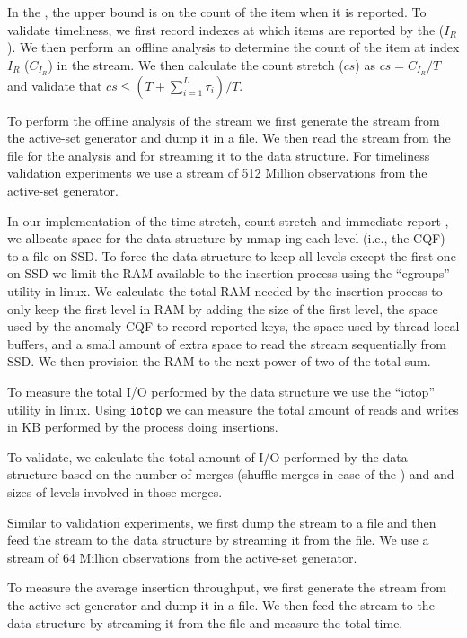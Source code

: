 In the \cs, the upper bound is on the count of the item when it is reported. To
validate timeliness, we first record indexes at which items are reported by
the \cs ($I_R$). We then perform an offline analysis to determine the count of
the item at index $I_R$ ($C_{I_R}$) in the stream. We then calculate the count
stretch ($cs$) as $cs=C_{I_R}/T$ and validate that $cs \leq (T+\sum_{i=1}^{L}
\tau_i)/T$.

To perform the offline analysis of the stream we first generate the stream from
the active-set generator and dump it in a file. We then read the stream from the
file for the analysis and for streaming it to the data structure. For timeliness
validation experiments we use a stream of 512 Million observations from the
active-set generator.

 In our implementation of the time-stretch,
count-stretch and immediate-report \LERT, we allocate space for the data structure by mmap-ing each level (i.e., the CQF)
to a file on SSD. To force the data structure to keep all levels except
the first one on SSD we limit the RAM available to the insertion process using
the ``cgroups'' utility in linux.
%
We calculate the total RAM needed by the insertion process to only keep the
first level in RAM by adding the size of the first level, the space used by the
anomaly CQF to record reported keys, the space used by thread-local buffers, and
a small amount of extra space to read the stream sequentially from SSD. We then
provision the RAM to the next power-of-two of the total sum.

To measure the total I/O performed by the data structure we use the ``iotop''
utility in linux.  Using \texttt{iotop} we can measure the total amount of reads
and writes in KB performed by the process doing insertions.

To validate, we calculate the total amount of I/O performed by the data
structure based on the number of merges (shuffle-merges in case of the \cs) and
\ts and sizes of levels involved in those merges.

Similar to validation experiments, we first dump the stream to a file and then
feed the stream to the data structure by streaming it from the file. We use a
stream of 64 Million observations from the active-set generator.

To measure the average insertion throughput, we first
generate the stream from the active-set generator and dump it in a file. We then
feed the stream to the data structure by streaming it from the file and measure
the total time.

